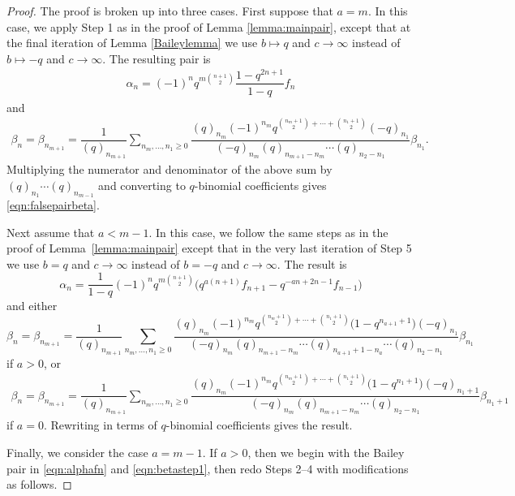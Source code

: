 \documentclass[pdftex]{sigma}
\numberwithin{equation}{section}
\begin{document}
\begin{proof}
The proof is broken up into three cases. First suppose that $a=m$. In this case, we apply Step 1 as in the proof of Lemma \ref{lemma:mainpair}, except that at the final iteration of Lemma \ref{Baileylemma} we use $b \mapsto q$ and $c \to \infty$ instead of $b \mapsto -q$ and $c \to \infty$. The resulting pair is
\begin{align*}
	\alpha_n= (-1)^nq^{m\binom{n+1}{2}}\dfrac{1-q^{2n+1}}{1-q}f_n
\end{align*}
and
\begin{align*}
	\beta_n=\beta_{n_{m+1}}=
	\dfrac{1}{(q)_{n_{m+1}}}\sum_{n_m,\dots,n_1\geq 0}
	\dfrac{(q)_{n_m}(-1)^{n_m}q^{\binom{n_m+1}{2}+\cdots+\binom{n_1+1}{2}}(-q)_{n_1}}{(-q)_{n_m}(q)_{n_{m+1}-n_m}\cdots (q)_{n_2-n_1}}\beta_{n_1}.
\end{align*}
Multiplying the numerator and denominator of the above sum by $(q)_{n_1} \cdots (q)_{n_{m-1}}$ and converting to $q$-binomial coefficients gives \eqref{eqn:falsepairbeta}.

Next assume that $a < m-1$. In this case, we follow the same steps as in the proof of Lemma~\ref{lemma:mainpair} except that in the very last iteration of Step 5 we use $b = q$ and $ c\to \infty$ instead of $b = -q$ and $c \to \infty$. The result is
\begin{equation*}
	\alpha_n =
	\dfrac{1}{1-q}(-1)^nq^{m\binom{n+1}{2}}\bigl(
	q^{a(n+1)}f_{n+1} -q^{-an+2n-1}f_{n-1}
	\bigr)
\end{equation*}
and either
\begin{equation*}
	\beta_n=\beta_{n_{m+1}}=
	\dfrac{1}{(q)_{n_{m+1}}}\sum_{n_m,\dots,n_1\geq 0}\!
	\dfrac{(q)_{n_m}(-1)^{n_m}q^{\binom{n_{m}+1}{2}+\cdots+\binom{n_1+1}{2}}\bigl(1-q^{n_{a+1}+1}\bigr)(-q)_{n_1}}
	{(-q)_{n_m}(q)_{n_{m+1}-n_{m}}\cdots
		(q)_{n_{a+1}+1-n_a}\cdots (q)_{n_2-n_1}}\beta_{n_1}
\end{equation*}
if $a > 0$, or
\begin{gather*}
	\beta_n=\beta_{n_{m+1}}=
	\dfrac{1}{(q)_{n_{m+1}}}\sum_{n_m,\dots,n_1\geq 0}\!
	\dfrac{(q)_{n_m}(-1)^{n_m}q^{\binom{n_{m}+1}{2}+\cdots+\binom{n_1+1}{2}}\bigl(1-q^{n_{1}+1}\bigr)(-q)_{n_1+1}}
	{(-q)_{n_m}(q)_{n_{m+1}-n_{m}}\cdots (q)_{n_2-n_1}}
	\beta_{n_1+1}
\end{gather*}
if $a=0$. Rewriting in terms of $q$-binomial coefficients gives the result.

Finally, we consider the case $a = m-1$. If $a > 0$, then we begin with the Bailey pair in \eqref{eqn:alphafn} and \eqref{eqn:betastep1}, then redo Steps 2--4 with modifications as follows.


\end{proof}
\end{document}
